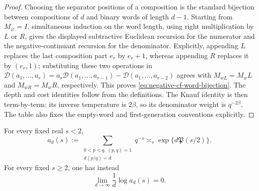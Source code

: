 \begin{proof}
Choosing the separator positions of a composition is the standard bijection
between compositions of \(d\) and binary words of length \(d-1\).  Starting
from \(M_\varnothing=I\), simultaneous induction on the word length, using
right multiplication by \(L\) or \(R\), gives the displayed subtractive
Euclidean recursion for the numerator and the negative-continuant recursion
for the denominator.  Explicitly, appending \(L\) replaces the last
composition part \(e_r\) by \(e_r+1\), whereas appending \(R\) replaces it by
\((e_r,1)\); substituting these two operations in
\(\mathcal D(a_1,\ldots,a_r)
=a_r\mathcal D(a_1,\ldots,a_{r-1})
-\mathcal D(a_1,\ldots,a_{r-2})\) agrees with
\(M_{wL}=M_wL\) and \(M_{wR}=M_wR\), respectively.  This proves
\eqref{eq:negative-cf-word-bijection}.
The depth and cost identities follow from the definitions.  The Knauf
identity is then term-by-term: its inverse temperature is \(2\beta\), so its
denominator weight is \(q^{-2\beta}\).  The table also fixes the empty-word
and first-generation conventions explicitly.
\end{proof}

\begin{lemma}
\label{lem:knauf-layer-estimate}
For every fixed real \(s<2\),
\begin{equation}
 a_d(s):=
 \sum_{\substack{0<p<q,\ (p,q)=1\\d(p/q)=d}}q^{-s}
 \asymp_s \exp\{d\mathfrak P(s/2)\}.
 \label{eq:knauf-layer-pressure}
\end{equation}
For every fixed \(s\ge2\), one has instead
\[
 \lim_{d\to\infty}\frac1d\log a_d(s)=0.
\]
\end{lemma}

